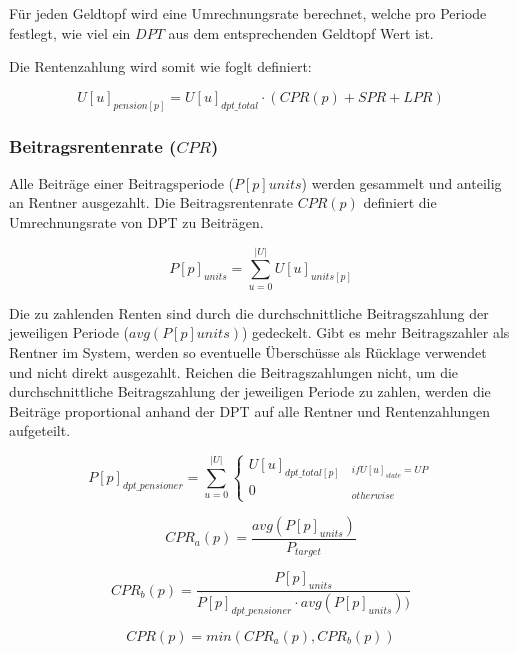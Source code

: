 Für jeden Geldtopf wird eine Umrechnungsrate berechnet, welche pro 
Periode festlegt, wie viel ein $DPT$ aus dem entsprechenden
Geldtopf Wert ist.

Die Rentenzahlung wird somit wie foglt definiert:

\begin{equation}
U[u]_{pension[p]} = U[u]_{dpt\_total} \cdot (CPR(p) + SPR + LPR)
\end{equation}

\subsubsection*{Beitragsrentenrate ($CPR$)}
Alle Beiträge einer Beitragsperiode ($P[p]units$) werden gesammelt und anteilig an Rentner ausgezahlt. Die Beitragsrentenrate $CPR(p)$ definiert die Umrechnungsrate von DPT zu Beiträgen.

\begin{equation}
P[p]_{units} = \sum_{u=0}^{|U|} U[u]_{units[p]}
\end{equation}

Die zu zahlenden Renten sind durch die durchschnittliche Beitragszahlung der 
jeweiligen Periode ($avg(P[p]units)$) gedeckelt. Gibt es mehr Beitragszahler als Rentner im System, werden so eventuelle Überschüsse als Rücklage verwendet und nicht direkt ausgezahlt. Reichen die Beitragszahlungen nicht, um die durchschnittliche Beitragszahlung der 
jeweiligen Periode zu zahlen, werden die Beiträge proportional anhand der DPT auf alle Rentner und Rentenzahlungen  aufgeteilt.

\begin{equation}
P[p]_{dpt\_pensioner} = 
\sum_{u=0}^{|U|} \begin{cases} 
U[u]_{dpt\_total[p]} & _{if U[u]_{state} = UP}\\
0 & _{otherwise}
\end{cases}
\end{equation}

\begin{equation*}
CPR_{a}(p) = \frac{avg(P[p]_{units})}{P_{target}}
\end{equation*}

\begin{equation*}
CPR_{b}(p) = \frac{P[p]_{units}} {P[p]_{dpt\_pensioner} \cdot avg(P[p]_{units}))}
\end{equation*}

\begin{equation}
CPR(p) = min(CPR_{a}(p), CPR_{b}(p))
\end{equation}


